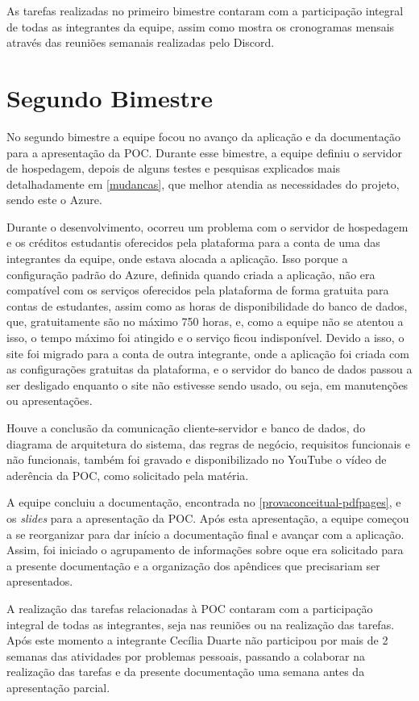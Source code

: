 As tarefas realizadas no primeiro bimestre contaram com a participação integral de todas as integrantes da equipe, assim como mostra os cronogramas mensais através das reuniões semanais realizadas pelo \gls{Discord}. 

\section{Segundo Bimestre}
No segundo bimestre a equipe focou no avanço da aplicação e da documentação para a apresentação da \ac{POC}.
Durante esse bimestre, a equipe definiu o servidor de hospedagem, depois de alguns testes e pesquisas explicados mais detalhadamente em \autoref{mudancas}, que melhor atendia as necessidades do projeto, sendo este o Azure.

Durante o desenvolvimento, ocorreu um problema com o servidor de hospedagem e os créditos estudantis oferecidos pela plataforma para a conta de uma das integrantes da equipe, onde estava alocada a aplicação. Isso porque a configuração padrão do Azure, definida quando criada a aplicação, não era compatível com os serviços oferecidos pela plataforma de forma gratuita para contas de estudantes, assim como as horas de disponibilidade do banco de dados, que, gratuitamente são no máximo 750 horas, e, como a equipe não se atentou a isso, o tempo máximo foi atingido e o serviço ficou indisponível. Devido a isso, o site foi migrado para a conta de outra integrante, onde a aplicação foi criada com as configurações gratuitas da plataforma, e o servidor do banco de dados passou a ser desligado enquanto o site não estivesse sendo usado, ou seja, em manutenções ou apresentações.

Houve a conclusão da comunicação cliente-servidor e banco de dados, do diagrama de arquitetura do sistema, das regras de negócio, requisitos funcionais e não funcionais, também foi gravado e disponibilizado no \gls{YouTube} o vídeo de aderência da \ac{POC}, como solicitado pela matéria.

A equipe concluiu a documentação, encontrada no \autoref{provaconceitual-pdfpages}, e os \textit{slides} para a apresentação da \ac{POC}. Após esta apresentação, a equipe começou a se reorganizar para dar início a documentação final e avançar com a aplicação. Assim, foi iniciado o agrupamento de informações sobre oque era solicitado para a presente documentação e a organização dos apêndices que precisariam ser apresentados.

A realização das tarefas relacionadas à \ac{POC} contaram com a participação integral de todas as integrantes, seja nas reuniões ou na realização das tarefas. Após este momento a integrante Cecília Duarte não participou por mais de 2 semanas das atividades por problemas pessoais, passando a colaborar na realização das tarefas e da presente documentação uma semana antes da apresentação parcial.

